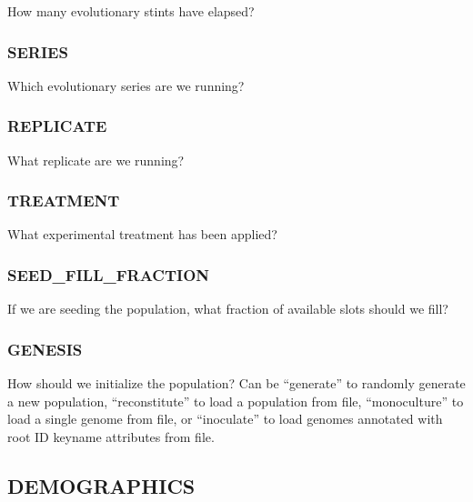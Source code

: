 How many evolutionary stints have elapsed?

\subsubsection{SERIES}


Which evolutionary series are we running?

\subsubsection{REPLICATE}


What replicate are we running?

\subsubsection{TREATMENT}


What experimental treatment has been applied?

\subsubsection{SEED\_FILL\_FRACTION}


If we are seeding the population, what fraction of available slots should we fill?

\subsubsection{GENESIS}


How should we initialize the population?
Can be ``generate'' to randomly generate a new population,  ``reconstitute'' to load a population from file, ``monoculture'' to load a single genome from file, or ``inoculate'' to load genomes annotated with root ID keyname attributes from file.


\subsection{DEMOGRAPHICS}


